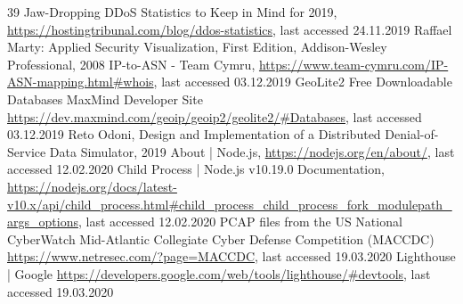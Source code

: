 \begin{thebibliography}{99}
 39 Jaw-Dropping DDoS Statistics to Keep in Mind for 2019, \url{https://hostingtribunal.com/blog/ddos-statistics}, last accessed 24.11.2019
 Raffael Marty: Applied Security Visualization, First Edition, Addison-Wesley Professional, 2008
 IP-to-ASN - Team Cymru, \url{https://www.team-cymru.com/IP-ASN-mapping.html#whois}, last accessed 03.12.2019
 GeoLite2 Free Downloadable Databases MaxMind Developer Site \url{https://dev.maxmind.com/geoip/geoip2/geolite2/#Databases}, last accessed 03.12.2019
 Reto Odoni, Design and Implementation of a Distributed Denial-of-Service Data Simulator, 2019
 About | Node.js, \url{https://nodejs.org/en/about/}, last accessed 12.02.2020
 Child Process | Node.js v10.19.0 Documentation, \url{https://nodejs.org/docs/latest-v10.x/api/child_process.html#child_process_child_process_fork_modulepath_args_options}, last accessed 12.02.2020
 PCAP files from the US National CyberWatch Mid-Atlantic Collegiate Cyber Defense Competition (MACCDC) \url{https://www.netresec.com/?page=MACCDC}, last accessed 19.03.2020
 Lighthouse | Google \url{https://developers.google.com/web/tools/lighthouse/#devtools}, last accessed 19.03.2020
\end{thebibliography}

